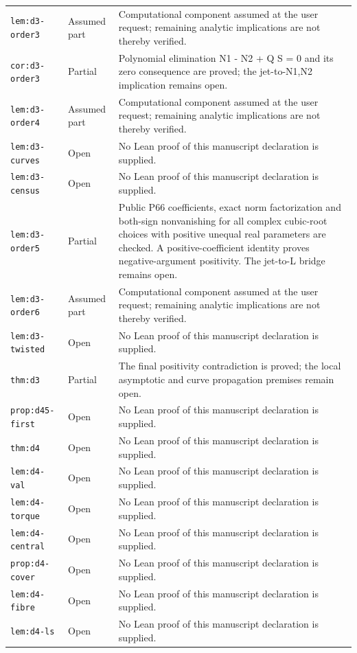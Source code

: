 \documentclass[Threeside,11pt]{article}
\theoremstyle{definition}
\theoremstyle{remark}
\numberwithin{equation}{section}
\theoremstyle{remark}
\newcommand{\code}[1]{\begingroup\def\_{\textunderscore\allowbreak}\texttt{#1}\endgroup}
\begin{document}
\begin{longtable}{p{4.0cm}p{1.8cm}p{8.9cm}}
\code{lem:d3-order3} & Assumed part & Computational component assumed at the user request; remaining analytic implications are not thereby verified. \\
\code{cor:d3-order3} & Partial & Polynomial elimination N1 - N2 + Q S = 0 and its zero consequence are proved; the jet-to-N1,N2 implication remains open. \\
\code{lem:d3-order4} & Assumed part & Computational component assumed at the user request; remaining analytic implications are not thereby verified. \\
\code{lem:d3-curves} & Open & No Lean proof of this manuscript declaration is supplied. \\
\code{lem:d3-census} & Open & No Lean proof of this manuscript declaration is supplied. \\
\code{lem:d3-order5} & Partial & Public P66 coefficients, exact norm factorization and both-sign nonvanishing for all complex cubic-root choices with positive unequal real parameters are checked. A positive-coefficient identity proves negative-argument positivity. The jet-to-L bridge remains open. \\
\code{lem:d3-order6} & Assumed part & Computational component assumed at the user request; remaining analytic implications are not thereby verified. \\
\code{lem:d3-twisted} & Open & No Lean proof of this manuscript declaration is supplied. \\
\code{thm:d3} & Partial & The final positivity contradiction is proved; the local asymptotic and curve propagation premises remain open. \\
\code{prop:d45-first} & Open & No Lean proof of this manuscript declaration is supplied. \\
\code{thm:d4} & Open & No Lean proof of this manuscript declaration is supplied. \\
\code{lem:d4-val} & Open & No Lean proof of this manuscript declaration is supplied. \\
\code{lem:d4-torque} & Open & No Lean proof of this manuscript declaration is supplied. \\
\code{lem:d4-central} & Open & No Lean proof of this manuscript declaration is supplied. \\
\code{prop:d4-cover} & Open & No Lean proof of this manuscript declaration is supplied. \\
\code{lem:d4-fibre} & Open & No Lean proof of this manuscript declaration is supplied. \\
\code{lem:d4-ls} & Open & No Lean proof of this manuscript declaration is supplied. \\

\end{longtable}
\end{document}
